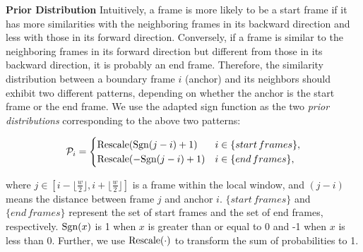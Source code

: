 \documentclass[letterpaper]{article} \usepackage[submission]{aaai23}  \usepackage{times}  \usepackage{helvet}  \usepackage{courier}  \usepackage[hyphens]{url}  \usepackage{graphicx} \urlstyle{rm} \def\UrlFont{\rm}  \usepackage{natbib}  \usepackage{caption} \frenchspacing  \setlength{\pdfpagewidth}{8.5in} \setlength{\pdfpageheight}{11in} \usepackage{algorithm}
\begin{document}
\textbf{Prior Distribution}\quad 
Intuitively, a frame is more likely to be a start frame if it has more similarities with the neighboring frames in its backward direction and less with those in its forward direction. Conversely, if a frame is similar to the neighboring frames in its forward direction but different from those in its backward direction, it is probably an end frame. Therefore, the similarity distribution between a boundary frame $i$ (anchor) and its neighbors should exhibit two different patterns, depending on whether the anchor is the start frame or the end frame. We use the adapted sign function as the two {\em prior distributions} corresponding to the above two patterns:
\begin{footnotesize}
\begin{equation}
\label{eq:prior}
\mathcal{P}_i =
\begin{cases}
\textup{Rescale}(\textup{Sgn}(j-i)+1) & i \in \{ start \, frames\}, \\
\textup{Rescale}(-\textup{Sgn}(j-i)+1) & i \in \{ end \, frames \}, \\
\end{cases}
\end{equation}
\end{footnotesize}
where $j\in [i-\lfloor \frac{w}{2} \rfloor, i+\lfloor \frac{w}{2} \rfloor ]$ is a frame within the local window, and $(j-i)$ means the distance between frame $j$ and anchor $i$. $\{ start \, frames\}$ and $\{ end \, frames \}$ represent the set of start frames and the set of end frames, respectively. $\textup{Sgn}(x)$ is 1 when $x$ is greater than or equal to 0 and -1 when $x$ is less than 0. Further, we use $\textup{Rescale}(\cdot)$ to transform the sum of probabilities to 1.
\end{document}
